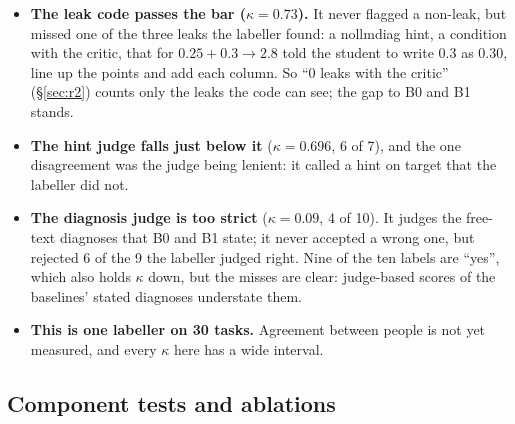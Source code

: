 \documentclass[11pt,a4paper]{article}
\newcommand{\cond}[1]{\textsf{#1}}
\begin{document}
\begin{itemize}
  \item \textbf{The leak code passes the bar ($\kappa = 0.73$).} It never flagged a non-leak, but missed one of the three leaks the labeller found: a \cond{nollmdiag} hint, a condition with the critic, that for $0.25 + 0.3 \to 2.8$ told the student to write $0.3$ as $0.30$, line up the points and add each column. So ``0 leaks with the critic'' (\S\ref{sec:r2}) counts only the leaks the code can see; the gap to B0 and B1 stands.
  \item \textbf{The hint judge falls just below it} ($\kappa = 0.696$, 6 of 7), and the one disagreement was the judge being lenient: it called a hint on target that the labeller did not.
  \item \textbf{The diagnosis judge is too strict} ($\kappa = 0.09$, 4 of 10). It judges the free-text diagnoses that B0 and B1 state; it never accepted a wrong one, but rejected 6 of the 9 the labeller judged right. Nine of the ten labels are ``yes'', which also holds $\kappa$ down, but the misses are clear: judge-based scores of the baselines' stated diagnoses understate them.
  \item \textbf{This is one labeller on 30 tasks.} Agreement between people is not yet measured, and every $\kappa$ here has a wide interval.
\end{itemize}

\subsection{Component tests and ablations}
\end{document}

